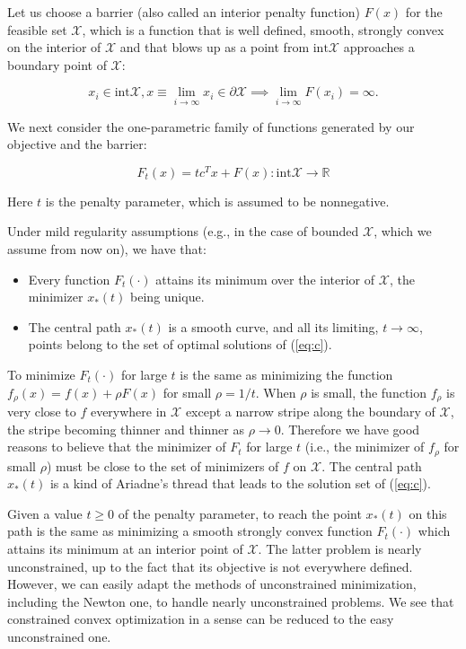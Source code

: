 \documentclass[11pt,a4paper]{article}
\newcommand{\X}{\mathcal{X}}
\newcommand{\R}{\mathbb{R}}
\begin{document}
Let us choose a barrier (also called an interior penalty function) $F(x)$ for the feasible set $\mathcal{X}$, which is a function that is well defined, smooth, strongly convex on the interior of $\mathcal{X}$ and that blows up as a point from $\text{int}\mathcal{X}$ approaches a boundary point of $\mathcal{X}$:

\begin{equation*}
    x_i \in \text{int} \mathcal{X}, x \equiv \underset{i\to \infty}{\lim} x_i \in \partial\mathcal{X} \implies \underset{i \to \infty}{\lim} F(x_i) = \infty.
\end{equation*}

We next consider the one-parametric family of functions generated by our objective and the barrier:

\begin{equation*}
    F_t(x) = tc^T x+F(x) : \text{int} \mathcal{X} \to \R
\end{equation*}

Here $t$ is the penalty parameter, which is assumed to be nonnegative.

Under mild regularity assumptions (e.g., in the case of bounded $\X$, which we assume from now on), we have that:

\begin{itemize}
    \item Every function $F_t(\cdot)$ attains its minimum over the interior of $\X$, the minimizer $x_*(t)$ being unique.
    \item The central path $x_*(t)$ is a smooth curve, and all its limiting, $t \to \infty$, points belong to the set of optimal solutions of (\ref{eq:c}).
\end{itemize}

To minimize $F_t(\cdot)$ for large $t$ is the same as minimizing the function $f_\rho (x) = f(x)+\rho F(x)$ for small $\rho =1/t$. When $\rho$ is small, the function $f_\rho$ is very close to $f$ everywhere in $\mathcal{X}$ except a narrow stripe along the boundary of $\mathcal{X}$, the stripe becoming thinner and thinner as $\rho \to 0$. Therefore we have good reasons to believe that the minimizer of $F_t$ for large $t$ (i.e., the minimizer of $f_\rho$ for small $\rho$) must be close to the set of minimizers of $f$ on $\X$. The central path $x_*(t)$ is a kind of Ariadne's thread that leads to the solution set of (\ref{eq:c}).

Given a value $t \geq 0$ of the penalty parameter, to reach the point $x_*(t)$ on this path is the same as minimizing a smooth strongly convex function $F_t(\cdot)$ which attains its minimum at an interior point of $\mathcal{X}$. The latter problem is nearly unconstrained, up to the fact that its objective is not everywhere defined. However, we can easily adapt the methods of unconstrained minimization, including the Newton one, to handle nearly unconstrained problems. We see that constrained convex optimization in a sense can be
reduced to the easy unconstrained one.
\end{document}
